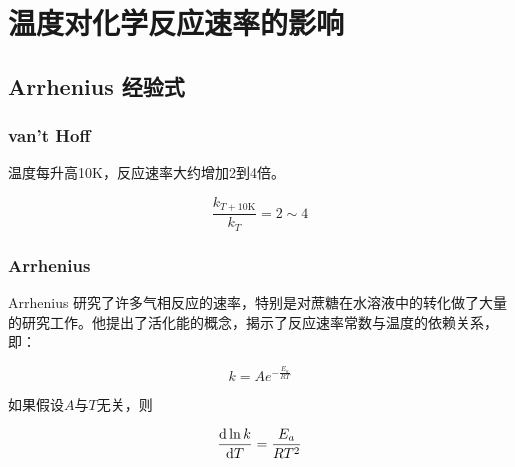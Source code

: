 \section{温度对化学反应速率的影响}


\subsection{Arrhenius 经验式}
\subsubsection{van't Hoff}

温度每升高10K，反应速率大约增加2到4倍。

\begin{equation*}
    \frac{k_{T + 10 \mathrm{K}}}{k_T} = 2 \sim 4
\end{equation*}


\subsubsection{Arrhenius}

Arrhenius 研究了许多气相反应的速率，特别是对蔗糖在水溶液中的转化做了大量的研究工作。他提出了活化能的概念，揭示了反应速率常数与温度的依赖关系，即：

\begin{equation*}
    k = Ae^{-\frac{E_a}{RT}}
\end{equation*}

如果假设$A$与$T$无关，则

\begin{equation*}
    \frac{\mathrm{d} \ln k}{\mathrm{d} T} = \frac{E_a}{RT^2}
\end{equation*}
